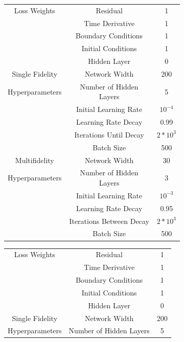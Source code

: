 \documentclass[12pt]{article}
\begin{document}
\begin{figure}[H]
\centering
    \begin{subfigure}{0.49\textwidth}
       \scriptsize
	\begin{center}
	\begin{tabular}{|c|c|c|} 
 	\hline
	 Loss Weights & Residual				& 1 \\
	        		& Time Derivative 	& 1 \\ 
	        		& Boundary Conditions 	& 1 \\ 
	 			& Initial Conditions		& 1 \\ 
	 			& Hidden Layer	& 0 \\
	\hline
	Single Fidelity	& Network Width			& 200 \\
	Hyperparameters & Number of Hidden Layers & 5 \\
					& Initial Learning Rate &  $10^{-4}$  \\
					& Learning Rate Decay & 0.99 \\
					& Iterations Until Decay & $2*10^3$ \\
					& Batch Size & 500 \\
 	\hline
	Multifidelity	& Network Width			& 30 \\
	Hyperparameters & Number of Hidden Layers & 3 \\
					& Initial Learning Rate & $10^{-3}$ \\
					& Learning Rate Decay & 0.95 \\
					& Iterations Between Decay & $2*10^3$ \\
					& Batch Size & 500 \\
 	\hline
	\end{tabular}
	\end{center}
	\caption{}
     \label{subfig:a}
    \end{subfigure}
    \begin{subfigure}{0.49\textwidth}
       \scriptsize
	\begin{center}
	\begin{tabular}{|c|c|c|} 
 	\hline
	 Loss Weights & Residual				& 1 \\
	        		& Time Derivative 	& 1 \\ 
	        		& Boundary Conditions 	& 1 \\ 
	 			& Initial Conditions		& 1 \\ 
	 			& Hidden Layer	& 0 \\
	\hline
	Single Fidelity	& Network Width			& 200 \\
	Hyperparameters & Number of Hidden Layers & 5 \\

\end{tabular}
\end{center}
\end{subfigure}
\end{figure}
\end{document}
